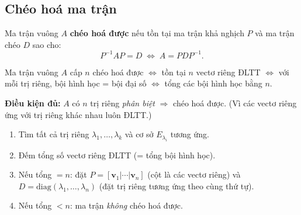\documentclass[12pt,a4paper]{article}
\begin{document}
\subsection{Chéo hoá ma trận}

\begin{dinhnghia}
  Ma trận vuông $A$ \textbf{chéo hoá được} nếu tồn tại ma trận khả nghịch $P$ và ma trận chéo $D$ sao cho:
  \[
    P^{-1} A P = D \;\Longleftrightarrow\; A = P D P^{-1}.
  \]
\end{dinhnghia}

\begin{dinhly}[title={Điều kiện chéo hoá}]
Ma trận vuông $A$ cấp $n$ chéo hoá được $\Leftrightarrow$ tồn tại $n$ vectơ riêng ĐLTT $\Leftrightarrow$ với mỗi trị riêng, bội hình học = bội đại số $\Leftrightarrow$ tổng các bội hình học bằng $n$.

\textbf{Điều kiện đủ:} $A$ có $n$ trị riêng \emph{phân biệt} $\Rightarrow$ chéo hoá được. (Vì các vectơ riêng ứng với trị riêng khác nhau luôn ĐLTT.)
\end{dinhly}

\begin{phuongphap}[title={Cách chéo hoá}]
\begin{enumerate}
  \item Tìm tất cả trị riêng $\lambda_1, \ldots, \lambda_k$ và cơ sở $E_{\lambda_i}$ tương ứng.
  \item Đếm tổng số vectơ riêng ĐLTT (= tổng bội hình học).
  \item Nếu tổng $= n$: đặt $P = [\mathbf{v}_1 | \cdots | \mathbf{v}_n]$ (cột là các vectơ riêng) và $D = \mathrm{diag}(\lambda_1, \ldots, \lambda_n)$ (đặt trị riêng tương ứng theo cùng thứ tự).
  \item Nếu tổng $< n$: ma trận \emph{không} chéo hoá được.
\end{enumerate}
\end{phuongphap}
\end{document}
